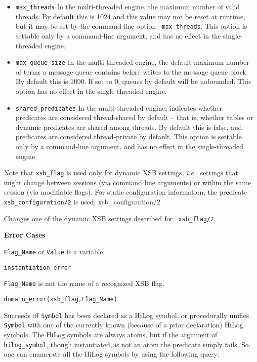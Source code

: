 \begin{description}
\begin{itemize}
\item {\tt max\_threads} In the multi-threaded engine, the maximum
  number of valid threads.  By default this is 1024 and this value may
  not be reset at runtime, but it may be set by the command-line
  option {\tt --max\_threads}.  This option is settable only by a
  command-line argument, and has no effect in the single-threaded
  engine.

\item {\tt max\_queue\_size} In the multi-threaded engine, the default
  maximum number of terms a message queue contains before writes to
  the message queue block.  By default this is 1000.  If set to 0,
  queues by default will be unbounded.  This option has no effect in
  the single-threaded engine.

\item {\tt shared\_predicates} In the multi-threaded engine, indicates
  whether predicates are considered thread-shared by default -- that
  is, whether tables or dynamic predicates are shared among threads.
  By default this is false, and predicates are considered
  thread-private by default.  This option is settable only by a
  command-line argument, and has no effect in the
  single-threaded engine.

\end{itemize}
    
Note that {\tt xsb\_flag} is used only for dynamic XSB settings, {\it
  i.e.}, settings that might change between sessions (via command line
arguments) or within the same session (via modifiable flags).  For
static configuration information, the predicate {\tt
  xsb\_configuration/2} is used. {xsb\_configuration/2}


%
Changes one of the dynamic XSB settings described for {\tt
  xsb\_flag/2}.

{\bf Error Cases}
\bi
\item 	{\tt Flag\_Name} or {\tt Value} is a variable.
\bi
\item 	{\tt instantiation\_error}
\ei
%
\item 	{\tt Flag\_Name} is not the name of a recognized XSB flag.
\bi
\item 	{\tt domain\_error(xsb\_flag,Flag\_Name)}
\ei

\ei


    Succeeds iff {\tt Symbol} has been declared as a HiLog symbol, or 
    procedurally unifies {\tt Symbol} with one of the currently known 
    (because of a prior declaration) HiLog symbols. The HiLog symbols
    are always atoms, but if the argument of {\tt hilog\_symbol},
    though instantiated, is not an atom the predicate simply fails.
    So, one can enumerate all the HiLog symbols by using the following
    query:


\end{description}
